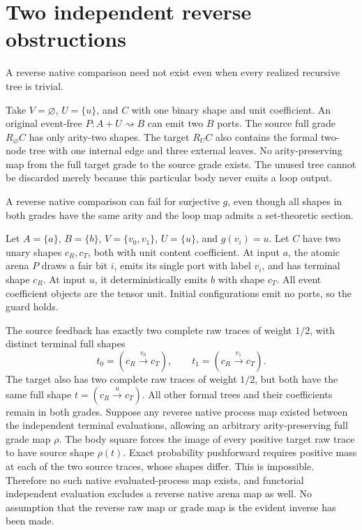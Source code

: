 \documentclass[11pt]{article}
\begin{document}
\section{Two independent reverse obstructions}
\begin{proposition}
A reverse native comparison need not exist even when every realized recursive tree is trivial.
\end{proposition}
Take $V=\varnothing$, $U=\{u\}$, and $C$ with one binary shape and unit coefficient. An original event-free $P:A+U\rightsquigarrow B$ can emit two $B$ ports. The source full grade $R_\varnothing C$ has only arity-two shapes. The target $R_U C$ also contains the formal two-node tree with one internal edge and three external leaves. No arity-preserving map from the full target grade to the source grade exists. The unused tree cannot be discarded merely because this particular body never emits a loop output.

\begin{proposition}
A reverse native comparison can fail for surjective $g$, even though all shapes in both grades have the same arity and the loop map admits a set-theoretic section.
\end{proposition}
Let $A=\{a\}$, $B=\{b\}$, $V=\{v_0,v_1\}$, $U=\{u\}$, and $g(v_i)=u$. Let $C$ have two unary shapes $c_R,c_T$, both with unit content coefficient. At input $a$, the atomic arena $P$ draws a fair bit $i$, emits its single port with label $v_i$, and has terminal shape $c_R$. At input $u$, it deterministically emits $b$ with shape $c_T$. All event coefficient objects are the tensor unit. Initial configurations emit no ports, so the guard holds.

The source feedback has exactly two complete raw traces of weight $1/2$, with distinct terminal full shapes
\[
 t_0=(c_R\xrightarrow{v_0}c_T),\qquad
 t_1=(c_R\xrightarrow{v_1}c_T).
\]
The target also has two complete raw traces of weight $1/2$, but both have the same full shape $t=(c_R\xrightarrow{u}c_T)$. All other formal trees and their coefficients remain in both grades. Suppose any reverse native process map existed between the independent terminal evaluations, allowing an arbitrary arity-preserving full grade map $\rho$. The body square forces the image of every positive target raw trace to have source shape $\rho(t)$. Exact probability pushforward requires positive mass at each of the two source traces, whose shapes differ. This is impossible. Therefore no such native evaluated-process map exists, and functorial independent evaluation excludes a reverse native arena map as well. No assumption that the reverse raw map or grade map is the evident inverse has been made.
\end{document}
